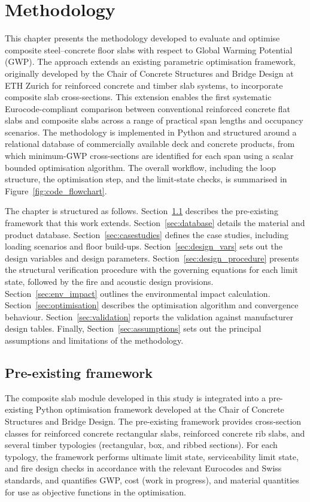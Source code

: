 \section{Methodology}
\label{thirdchapter}

This chapter presents the methodology developed to evaluate and optimise composite steel--concrete floor slabs with respect to Global Warming Potential (GWP). The approach extends an existing parametric optimisation framework, originally developed by the Chair of Concrete Structures and Bridge Design at ETH Zurich for reinforced concrete and timber slab systems, to incorporate composite slab cross-sections. This extension enables the first systematic Eurocode-compliant comparison between conventional reinforced concrete flat slabs and composite slabs across a range of practical span lengths and occupancy scenarios. The methodology is implemented in Python and structured around a relational database of commercially available deck and concrete products, from which minimum-GWP cross-sections are identified for each span using a scalar bounded optimisation algorithm. The overall workflow, including the loop structure, the optimisation step, and the limit-state checks, is summarised in Figure~\ref{fig:code_flowchart}.

The chapter is structured as follows. Section~\ref{sec:prior_work} describes the pre-existing framework that this work extends. Section~\ref{sec:database} details the material and product database. Section~\ref{sec:casestudies} defines the case studies, including loading scenarios and floor build-ups. Section~\ref{sec:design_vars} sets out the design variables and design parameters. Section~\ref{sec:design_procedure} presents the structural verification procedure with the governing equations for each limit state, followed by the fire and acoustic design provisions. Section~\ref{sec:env_impact} outlines the environmental impact calculation. Section~\ref{sec:optimisation} describes the optimisation algorithm and convergence behaviour. Section~\ref{sec:validation} reports the validation against manufacturer design tables. Finally, Section~\ref{sec:assumptions} sets out the principal assumptions and limitations of the methodology.

\subsection{Pre-existing framework}
\label{sec:prior_work}
The composite slab module developed in this study is integrated into a pre-existing Python optimisation framework developed at the Chair of Concrete Structures and Bridge Design. The pre-existing framework provides cross-section classes for reinforced concrete rectangular slabs, reinforced concrete rib slabs, and several timber typologies (rectangular, box, and ribbed sections). For each typology, the framework performs ultimate limit state, serviceability limit state, and fire design checks in accordance with the relevant Eurocodes and Swiss standards, and quantifies GWP, cost (work in progress), and material quantities for use as objective functions in the optimisation.

